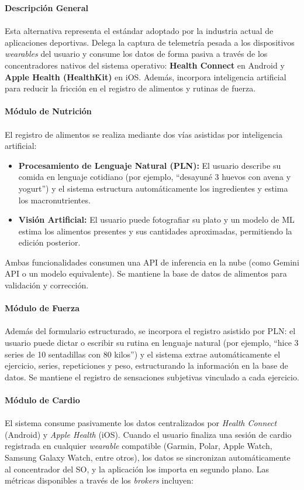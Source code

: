 \documentclass[12pt]{article}
\begin{document}
\textbf{Descripción General}
\\\\
Esta alternativa representa el estándar adoptado por la industria actual de aplicaciones deportivas. Delega la captura de telemetría pesada a los dispositivos \textit{wearables} del usuario y consume los datos de forma pasiva a través de los concentradores nativos del sistema operativo: \textbf{Health Connect} en Android y \textbf{Apple Health (HealthKit)} en iOS. Además, incorpora inteligencia artificial para reducir la fricción en el registro de alimentos y rutinas de fuerza.
\\\\
\textbf{Módulo de Nutrición}
\\\\
El registro de alimentos se realiza mediante dos vías asistidas por inteligencia artificial:
\begin{itemize}
    \item \textbf{Procesamiento de Lenguaje Natural (PLN):} El usuario describe su comida en lenguaje cotidiano (por ejemplo, ``desayuné 3 huevos con avena y yogurt'') y el sistema estructura automáticamente los ingredientes y estima los macronutrientes.
    \item \textbf{Visión Artificial:} El usuario puede fotografiar su plato y un modelo de ML estima los alimentos presentes y sus cantidades aproximadas, permitiendo la edición posterior.
\end{itemize}
Ambas funcionalidades consumen una API de inferencia en la nube (como Gemini API o un modelo equivalente). Se mantiene la base de datos de alimentos para validación y corrección.
\\\\
\textbf{Módulo de Fuerza}
\\\\
Además del formulario estructurado, se incorpora el registro asistido por PLN: el usuario puede dictar o escribir su rutina en lenguaje natural (por ejemplo, ``hice 3 series de 10 sentadillas con 80 kilos'') y el sistema extrae automáticamente el ejercicio, series, repeticiones y peso, estructurando la información en la base de datos. Se mantiene el registro de sensaciones subjetivas vinculado a cada ejercicio.
\\\\
\textbf{Módulo de Cardio}
\\\\
El sistema consume pasivamente los datos centralizados por \textit{Health Connect} (Android) y \textit{Apple Health} (iOS). Cuando el usuario finaliza una sesión de cardio registrada en cualquier \textit{wearable} compatible (Garmin, Polar, Apple Watch, Samsung Galaxy Watch, entre otros), los datos se sincronizan automáticamente al concentrador del SO, y la aplicación los importa en segundo plano. Las métricas disponibles a través de los \textit{brokers} incluyen:
\end{document}

